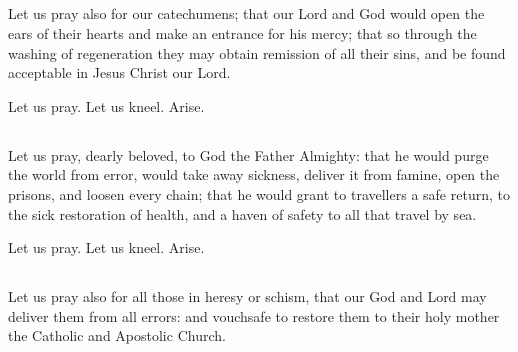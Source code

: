 \subsection{}
Let us pray also for our catechumens; that our Lord and God would open the ears of their hearts and make an entrance for his mercy; that so through the washing of regeneration they may obtain remission of all their sins, and be found acceptable in Jesus Christ our Lord. 

\centerline{Let us pray. Let us kneel. Arise.}

\subsection{}


\subsection{}
Let us pray, dearly beloved, to God the Father Almighty: that he would purge the world from error, would take away sickness, deliver it from famine, open the prisons, and loosen every chain; that he would grant to travellers a safe return, to the sick restoration of health, and a haven of safety to all that travel by sea.

\centerline{Let us pray. Let us kneel. Arise.}

\subsection{}

\subsection{}
Let us pray also for all those in heresy or schism, that our God and Lord may deliver them from all errors: and vouchsafe to restore them to their holy mother the Catholic and Apostolic Church.

